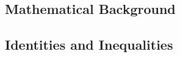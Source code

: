 \begin{appendices}

\chapter{Mathematical Background}
\section{Identities and Inequalities}

\end{appendices}
